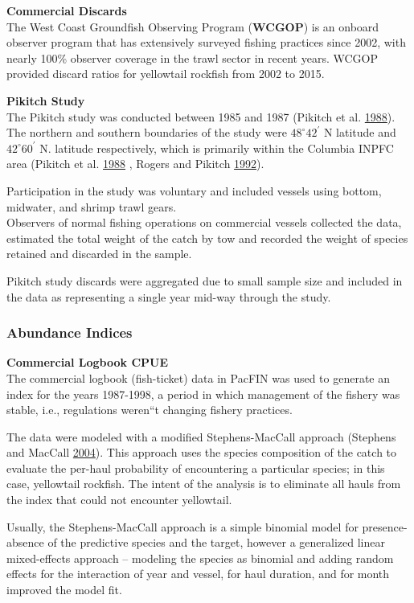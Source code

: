 \documentclass[12pt,]{article}
\begin{document}
\textbf{Commercial Discards}\\
The West Coast Groundfish Observing Program (\textbf{WCGOP}) is an
onboard observer program that has extensively surveyed fishing practices
since 2002, with nearly 100\% observer coverage in the trawl sector in
recent years. WCGOP provided discard ratios for yellowtail rockfish from
2002 to 2015.

\textbf{Pikitch Study}\\
The Pikitch study was conducted between 1985 and 1987 (Pikitch et al.
\protect\hyperlink{ref-Pikitch1988}{1988}). The northern and southern
boundaries of the study were \(48^\circ 42^\prime\) N latitude and
\(42^\circ 60^\prime\) N. latitude respectively, which is primarily
within the Columbia INPFC area (Pikitch et al.
\protect\hyperlink{ref-Pikitch1988}{1988} , Rogers and Pikitch
\protect\hyperlink{ref-Rogers1992}{1992}).

Participation in the study was voluntary and included vessels using
bottom, midwater, and shrimp trawl gears.\\
Observers of normal fishing operations on commercial vessels collected
the data, estimated the total weight of the catch by tow and recorded
the weight of species retained and discarded in the sample.

Pikitch study discards were aggregated due to small sample size and
included in the data as representing a single year mid-way through the
study.

\subsubsection{Abundance Indices}\label{abundance-indices}

\textbf{Commercial Logbook CPUE}\\
The commercial logbook (fish-ticket) data in PacFIN was used to generate
an index for the years 1987-1998, a period in which management of the
fishery was stable, i.e., regulations weren``t changing fishery
practices.

The data were modeled with a modified Stephens-MacCall approach
(Stephens and MacCall \protect\hyperlink{ref-Stephens2004}{2004}). This
approach uses the species composition of the catch to evaluate the
per-haul probability of encountering a particular species; in this case,
yellowtail rockfish. The intent of the analysis is to eliminate all
hauls from the index that could not encounter yellowtail.

Usually, the Stephens-MacCall approach is a simple binomial model for
presence-absence of the predictive species and the target, however a
generalized linear mixed-effects approach -- modeling the species as
binomial and adding random effects for the interaction of year and
vessel, for haul duration, and for month improved the model fit.
\end{document}
